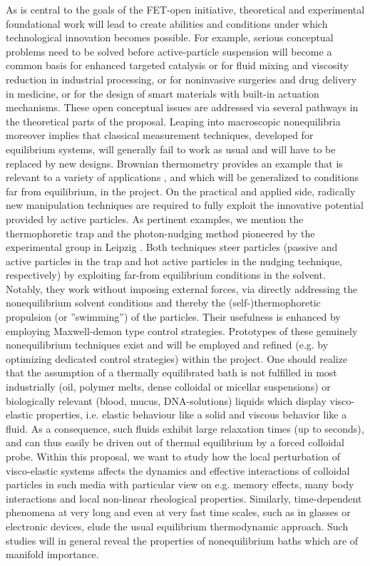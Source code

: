  As is central to the goals
of the FET-open initiative, theoretical and experimental foundational work will lead to
create abilities and conditions under which technological innovation becomes possible.  For
example, serious conceptual problems need to be solved before active-particle suspension
will become a common basis for enhanced targeted catalysis or for fluid mixing and viscosity
reduction in industrial processing, or for noninvasive surgeries and drug delivery in
medicine, or for the design of smart materials with built-in actuation mechanisms. These
open conceptual issues are addressed via several pathways in the theoretical parts of the
proposal.  Leaping into macroscopic nonequilibria moreover implies that classical
measurement techniques, developed for equilibrium systems, will generally fail to work as
usual and will have to be replaced by new designs. Brownian thermometry provides an example
that is relevant to a variety of applications \cite{kroy:2014}, and which will be
generalized to conditions far from equilibrium, in the project.  On the practical and
applied side, radically new manipulation techniques are required to fully exploit the
innovative potential provided by active particles. As pertinent examples, we mention the
thermophoretic trap and the photon-nudging method pioneered by the experimental group in
Leipzig \cite{Qian2013,Braun:NanoLetters:2015}.  Both techniques steer particles (passive
and active particles in the trap and hot active particles in the nudging technique,
respectively) by exploiting far-from equilibrium conditions in the solvent. Notably, they
work without imposing external forces, via directly addressing the nonequilibrium solvent
conditions and thereby the (self-)thermophoretic propulsion (or ''swimming'') of the
particles. Their usefulness is enhanced by employing Maxwell-demon type control
strategies. Prototypes of these genuinely nonequilibrium techniques exist and will be
employed and refined (e.g. by optimizing dedicated control strategies) within the project.
One should realize that the assumption of a thermally equilibrated bath is not fulfilled in
most industrially (oil, polymer melts, dense colloidal or micellar suspensions) or
biologically relevant (blood, mucus, DNA-solutions) liquids which display visco-elastic
properties, i.e. elastic behaviour like a solid and viscous behavior like a fluid. As a
consequence, such fluids exhibit large relaxation times (up to seconds), and can thus easily
be driven out of thermal equilibrium by a forced colloidal probe. Within this proposal, we
want to study how the local perturbation of visco-elastic systems affects the dynamics and
effective interactions of colloidal particles in such media with particular view on
e.g. memory effects, many body interactions and local non-linear rheological properties.
Similarly, time-dependent phenomena at very long and even at very fast time scales, such as
in glasses or electronic devices, elude the usual equilibrium thermodynamic
approach.  Such studies will in general reveal the properties of nonequilibrium baths which
are of manifold importance.

